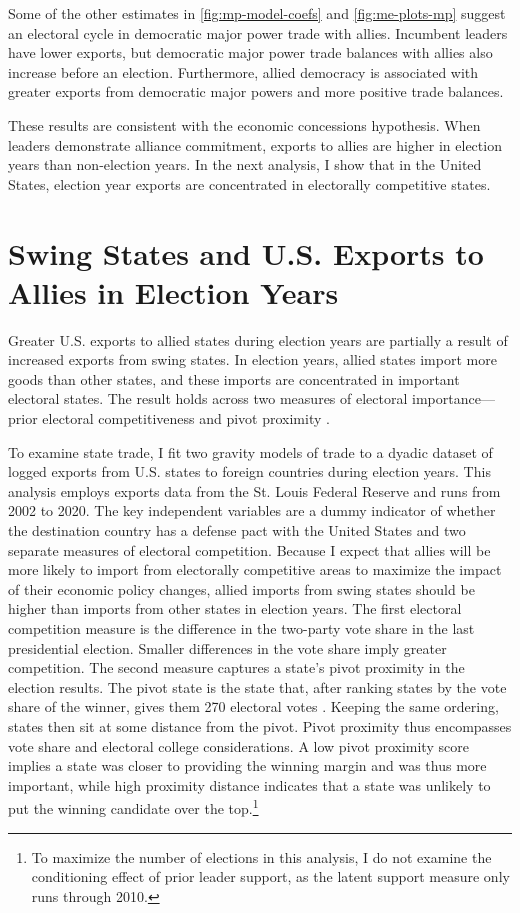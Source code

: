\documentclass[12pt]{article}
\begin{document}
Some of the other estimates in \autoref{fig:mp-model-coefs} and \autoref{fig:me-plots-mp} suggest an electoral cycle in democratic major power trade with allies.
Incumbent leaders have lower exports, but democratic major power trade balances with allies also increase before an election.
Furthermore, allied democracy is associated with greater exports from democratic major powers and more positive trade balances.


These results are consistent with the economic concessions hypothesis. 
When leaders demonstrate alliance commitment, exports to allies are higher in election years than non-election years.
In the next analysis, I show that in the United States, election year exports are concentrated in electorally competitive states.



\section{Swing States and U.S. Exports to Allies in Election Years}


Greater U.S. exports to allied states during election years are partially a result of increased exports from swing states.
In election years, allied states import more goods than other states, and these imports are concentrated in important electoral states.
The result holds across two measures of electoral importance--- prior electoral competitiveness and pivot proximity \citep{Wright2009}.


To examine state trade, I fit two gravity models of trade to a dyadic dataset of logged exports from U.S. states to foreign countries during election years.
This analysis employs exports data from the St. Louis Federal Reserve and runs from 2002 to 2020.
The key independent variables are a dummy indicator of whether the destination country has a defense pact with the United States and two separate measures of electoral competition. 
Because I expect that allies will be more likely to import from electorally competitive areas to maximize the impact of their economic policy changes, allied imports from swing states should be higher than imports from other states in election years. 
The first electoral competition measure is the difference in the two-party vote share in the last presidential election.
Smaller differences in the vote share imply greater competition.
The second measure captures a state's pivot proximity in the election results. 
The pivot state is the state that, after ranking states by the vote share of the winner, gives them 270 electoral votes \citep{Wright2009}.
Keeping the same ordering, states then sit at some distance from the pivot. 
Pivot proximity thus encompasses vote share and electoral college considerations. 
A low pivot proximity score implies a state was closer to providing the winning margin and was thus more important, while high proximity distance indicates that a state was unlikely to put the winning candidate over the top.\footnote{To maximize the number of elections in this analysis, I do not examine the conditioning effect of prior leader support, as the latent support measure only runs through 2010.} 
\end{document}
